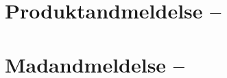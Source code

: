 \begin{minipage}[t]{100mm}
\vspace{1mm}
\section*{Produktandmeldelse -- }

\vspace{1mm}
\section*{Madandmeldelse -- }
\vspace{2mm}



\end{minipage}

